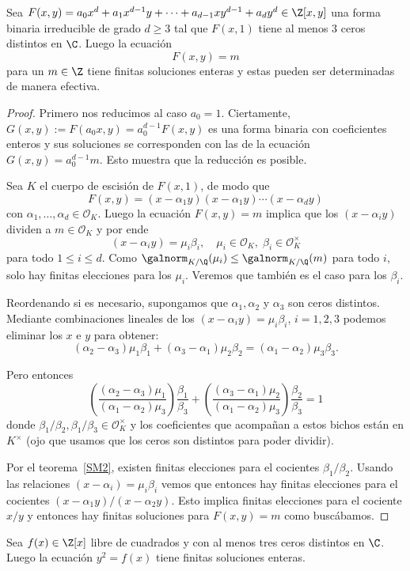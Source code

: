 \documentclass[11pt, reqno]{amsart}
\begin{document}
\begin{prop}
	Sea $F(x,y)=a_0x^d+a_1x^{d-1}y+\cdots+a_{d-1}xy^{d-1}+a_dy^d\in \Z[x,y]$ una forma binaria irreducible de grado $d\geq 3$ tal que $F(x,1)$ tiene al menos 3 ceros distintos en $\C$. Luego la ecuación $$F(x,y)=m$$ para un $m\in \Z$ tiene finitas soluciones enteras  y estas pueden ser determinadas de manera efectiva.
\end{prop}
\begin{proof}
	Primero nos reducimos al caso $a_0=1$. Ciertamente, $G(x,y):=F(a_0x,y)=a_0^{d-1}F(x,y)$ es una forma binaria con coeficientes enteros y sus soluciones se corresponden con las de la ecuación $G(x,y)=a_0^{d-1}m$. Esto muestra que la reducción es posible.

	Sea $K$ el cuerpo de escisión de $F(x,1)$, de modo que $$F(x,y)=(x-\alpha_1y)(x-\alpha_1y)\cdots(x-\alpha_dy)$$ con $\alpha_1,\ldots,\alpha_d\in \mathcal{O}_K$. Luego la ecuación $F(x,y)=m$ implica que los $(x-\alpha_iy)$ dividen a $m\in \mathcal{O}_K$ y por ende $$(x-\alpha_iy)=\mu_i\beta_i,\quad \mu_i\in \mathcal{O}_K,\;\beta_i\in \mathcal{O}_K^{\times}$$ para todo $1\leq i\leq d$. Como $\galnorm_{K/\Q}(\mu_i)\leq \galnorm_{K/\Q}(m)$ para todo $i$, solo hay finitas elecciones para los $\mu_i$. Veremos que también es el caso para los $\beta_i$.

	Reordenando si es necesario, supongamos que $\alpha_1,\alpha_2$ y $\alpha_3$ son ceros distintos. Mediante combinaciones lineales de los $(x-\alpha_iy)=\mu_i\beta_i$, $i=1,2,3$ podemos eliminar los $x$ e $y$ para obtener:
	$$(\alpha_2-\alpha_3)\mu_1\beta_1+(\alpha_3-\alpha_1)\mu_2\beta_2=(\alpha_1-\alpha_2)\mu_3\beta_3.$$

	Pero entonces $$\left( \frac{(\alpha_2-\alpha_3)\mu_1}{(\alpha_1-\alpha_2)\mu_3} \right)\frac{\beta_1}{\beta_3}+\left( \frac{(\alpha_3-\alpha_1)\mu_2}{(\alpha_1-\alpha_2)\mu_3} \right)\frac{\beta_2}{\beta_3}=1$$ donde $\beta_1/\beta_2,\beta_1/\beta_3\in \mathcal{O}_K^{\times}$ y los coeficientes que acompañan a estos bichos están en $K^{\times}$ (ojo que usamos que los ceros son distintos para poder dividir).

	Por el teorema~\ref{SM2}, existen finitas elecciones para el cocientes $\beta_1/\beta_2$. Usando las relaciones $(x-\alpha_i)=\mu_i\beta_i$ vemos que entonces hay finitas elecciones para el cocientes $(x-\alpha_1y)/(x-\alpha_2y)$. Esto implica finitas elecciones para el cociente $x/y$ y entonces hay finitas soluciones para $F(x,y)=m$ como buscábamos.
\end{proof}

\begin{prop}
	Sea $f(x)\in \Z[x]$ libre de cuadrados y con al menos tres ceros distintos en $\C$. Luego la ecuación $y^2=f(x)$ tiene finitas soluciones enteras.
\end{prop}

\nocite{baker:transcendental, evertse:unit, stewart1991abc, stewart1991abc, stewart1986oesterle}
\printbibliography
\end{document}
